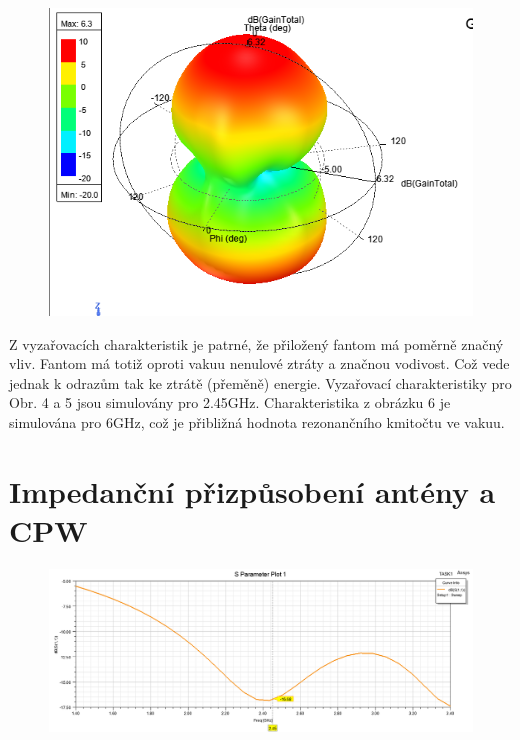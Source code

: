 \documentclass[10pt, a4paper]{article}%
\begin{document}
\begin{figure}[ht!]
\begin{minipage}{0.32\textwidth}
			\includegraphics[width= 1\textwidth]{GAIN_model_GHz.png}
		\end{minipage}
		\end{figure}


		Z vyzařovacích charakteristik je patrné, že přiložený fantom má poměrně značný vliv.
		Fantom má totiž oproti vakuu nenulové ztráty a značnou vodivost. Což vede jednak k odrazům
		tak ke ztrátě (přeměně) energie. Vyzařovací charakteristiky pro Obr. 4 a 5 jsou simulovány
		pro 2.45GHz. Charakteristika z obrázku 6 je simulována pro 6GHz, což je přibližná hodnota
		rezonančního kmitočtu ve vakuu.
		\clearpage
	\section{\Large Impedanční přizpůsobení antény a CPW}

	\begin{figure}[ht!]
		\centering
		\includegraphics[width = 1\textwidth]{S11.png}
	\end{figure}
\end{document}
